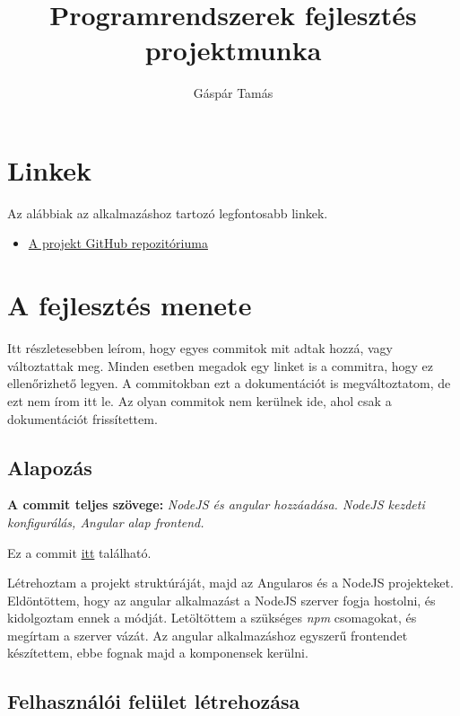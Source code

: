 \documentclass[]{article}
\title{Programrendszerek fejlesztés projektmunka}
\author{Gáspár Tamás}
\begin{document}
\maketitle

\tableofcontents

\section{Linkek}

Az alábbiak az alkalmazáshoz tartozó legfontosabb linkek.

\begin{itemize}
	\item \href{https://github.com/Gtomika/prf-project}{A projekt GitHub repozitóriuma}
\end{itemize}

\section{A fejlesztés menete}

Itt részletesebben leírom, hogy egyes commitok mit adtak hozzá, vagy változtattak meg. Minden esetben megadok egy linket is a 
commitra, hogy ez ellenőrizhető legyen. A commitokban ezt a dokumentációt is megváltoztatom, de ezt nem írom itt le. Az olyan commitok nem kerülnek ide, ahol csak a dokumentációt frissítettem. 

\subsection{Alapozás}

\noindent
\textbf{A commit teljes szövege:} \textit{NodeJS és angular hozzáadása. NodeJS kezdeti konfigurálás, Angular alap frontend.}

\bigskip
\noindent
Ez a commit \href{https://github.com/Gtomika/prf-project/commit/170975c76199384bc0c8c9524929d8804e70a56d}{itt} található.
\bigskip

Létrehoztam a projekt struktúráját, majd az Angularos és a NodeJS projekteket. Eldöntöttem, hogy az angular alkalmazást a NodeJS szerver fogja hostolni, és kidolgoztam ennek a módját. 
Letöltöttem a szükséges \textit{npm} csomagokat, és megírtam a szerver vázát. Az angular alkalmazáshoz egyszerű frontendet készítettem, ebbe fognak majd a komponensek kerülni.

\subsection{Felhasználói felület létrehozása}
\end{document}
